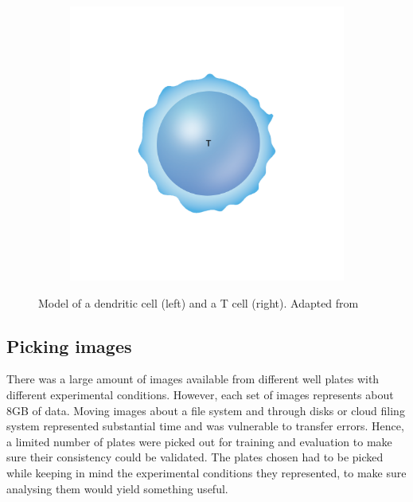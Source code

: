 \documentclass{l4proj}
\begin{document}
\begin{figure}[h]
\begin{subfigure}[h!]{0.3\textwidth}
    \end{subfigure}
    \begin{subfigure}[h!]{0.3\textwidth}
        \includegraphics[width=\textwidth]{dissertation/figures/model_Tcell.png}
    \end{subfigure}
    \caption{Model of a dendritic cell (left) and a T cell (right). Adapted from \cite{https://www.immunology.org/public-information/bitesized-immunology/systems-and-processes/t-cell-activation}}
    \label{eval:graphs}
\end{figure}

\subsection{Picking images}

There was a large amount of images available from different well plates with different experimental conditions. However, each set of images represents about 8GB of data. Moving images about a file system and through disks or cloud filing system represented substantial time and was vulnerable to transfer errors. Hence, a limited number of plates were picked out for training and evaluation to make sure their consistency could be validated. The plates chosen had to be picked while keeping in mind the experimental conditions they represented, to make sure analysing them would yield something useful.
\end{document}
